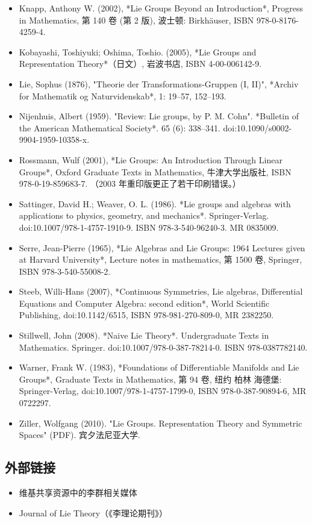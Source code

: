 \begin{itemize}
\item Knapp, Anthony W. (2002), *Lie Groups Beyond an Introduction*, Progress in Mathematics, 第 140 卷 (第 2 版), 波士顿: Birkhäuser, ISBN 978-0-8176-4259-4.
\item Kobayashi, Toshiyuki; Oshima, Toshio. (2005), *Lie Groups and Representation Theory*（日文）, 岩波书店, ISBN 4-00-006142-9.
\item Lie, Sophus (1876), "Theorie der Transformations-Gruppen (I, II)", *Archiv for Mathematik og Naturvidenskab*, 1: 19–57, 152–193.
\item Nijenhuis, Albert (1959). "Review: Lie groups, by P. M. Cohn". *Bulletin of the American Mathematical Society*. 65 (6): 338–341. doi:10.1090/s0002-9904-1959-10358-x.
\item Rossmann, Wulf (2001), *Lie Groups: An Introduction Through Linear Groups*, Oxford Graduate Texts in Mathematics, 牛津大学出版社, ISBN 978-0-19-859683-7. （2003 年重印版更正了若干印刷错误。）
\item Sattinger, David H.; Weaver, O. L. (1986). *Lie groups and algebras with applications to physics, geometry, and mechanics*. Springer-Verlag. doi:10.1007/978-1-4757-1910-9. ISBN 978-3-540-96240-3. MR 0835009.
\item Serre, Jean-Pierre (1965), *Lie Algebras and Lie Groups: 1964 Lectures given at Harvard University*, Lecture notes in mathematics, 第 1500 卷, Springer, ISBN 978-3-540-55008-2.
\item Steeb, Willi-Hans (2007), *Continuous Symmetries, Lie algebras, Differential Equations and Computer Algebra: second edition*, World Scientific Publishing, doi:10.1142/6515, ISBN 978-981-270-809-0, MR 2382250.
\item Stillwell, John (2008). *Naive Lie Theory*. Undergraduate Texts in Mathematics. Springer. doi:10.1007/978-0-387-78214-0. ISBN 978-0387782140.
\item Warner, Frank W. (1983), *Foundations of Differentiable Manifolds and Lie Groups*, Graduate Texts in Mathematics, 第 94 卷, 纽约 柏林 海德堡: Springer-Verlag, doi:10.1007/978-1-4757-1799-0, ISBN 978-0-387-90894-6, MR 0722297.
\item Ziller, Wolfgang (2010). "Lie Groups. Representation Theory and Symmetric Spaces" (PDF). 宾夕法尼亚大学.
\end{itemize}
\subsection{外部链接}
\begin{itemize}
\item 维基共享资源中的李群相关媒体
\item Journal of Lie Theory（《李理论期刊》）
\end{itemize}